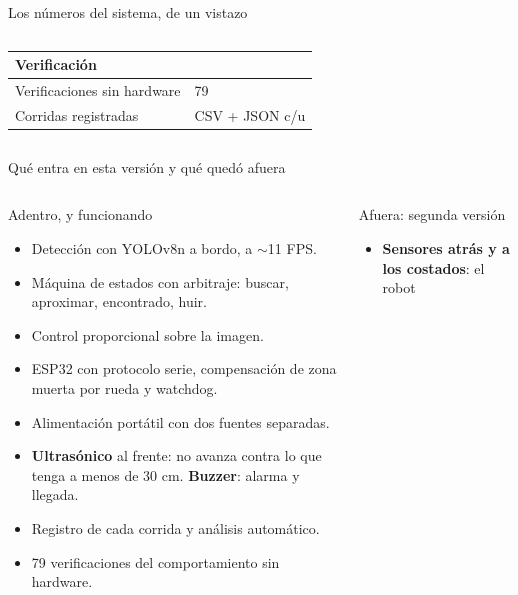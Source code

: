 \begin{frame}{Los números del sistema, de un vistazo}
{\begin{columns}[T,onlytextwidth]
\begin{column}{0.49\textwidth}
      \vspace{0.5em}
      \begin{tabular}{L{3.9cm}L{2.9cm}}
        \toprule
        \textbf{Verificación} & \\
        \midrule
        Verificaciones sin hardware & 79 \\
        Corridas registradas & CSV + JSON c/u \\
        \bottomrule
      \end{tabular}
    \end{column}
  \end{columns}}
\end{frame}

\begin{frame}{Qué entra en esta versión y qué quedó afuera}
  \begin{columns}[T,onlytextwidth]
    \begin{column}{0.485\textwidth}
      \begin{exampleblock}{Adentro, y funcionando}
        \begin{itemize}
          \item Detección con YOLOv8n a bordo, a $\sim$11 FPS.
          \item Máquina de estados con arbitraje: buscar, aproximar,
                encontrado, huir.
          \item Control proporcional sobre la imagen.
          \item ESP32 con protocolo serie, compensación de zona muerta por
                rueda y watchdog.
          \item Alimentación portátil con dos fuentes separadas.
          \item \textbf{Ultrasónico} al frente: no avanza contra lo que
                tenga a menos de 30 cm. \textbf{Buzzer}: alarma y llegada.
          \item Registro de cada corrida y análisis automático.
          \item 79 verificaciones del comportamiento sin hardware.
        \end{itemize}
      \end{exampleblock}
    \end{column}
    \begin{column}{0.485\textwidth}
      \begin{alertblock}{Afuera: segunda versión}
        \begin{itemize}
          \item \textbf{Sensores atrás y a los costados}: el robot

\end{itemize}
\end{alertblock}
\end{column}
\end{columns}
\end{frame}
